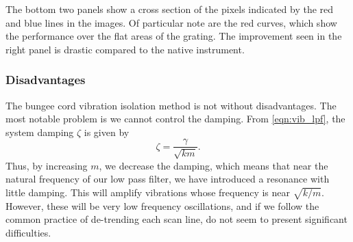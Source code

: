 The bottom two panels show a cross section of the pixels indicated by the red and blue lines in the images. Of particular note are the red curves, which show the performance over the flat areas of the grating. The improvement seen in the right panel is drastic compared to the native instrument.

\subsubsection{Disadvantages}
The bungee cord vibration isolation method is not without disadvantages. The most notable problem is we cannot control the damping. From \eqref{eqn:vib_lpf}, the system damping $\zeta$ is given by
\begin{equation}
  \zeta = \frac{\gamma}{\sqrt{km}}.
\end{equation}
Thus, by increasing $m$, we decrease the damping, which means that near the natural frequency of our low pass filter, we have introduced a resonance with little damping. This will amplify vibrations whose frequency is near $\sqrt{k/m}$. However, these will be very low frequency oscillations, and if we follow the common practice of de-trending each scan line, do not seem to present significant difficulties.


%   
%   


